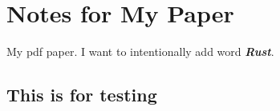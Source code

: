 \documentclass[12pt]{article}
\begin{document}
\section*{Notes for My Paper}
My pdf paper. I want to intentionally add word \textbf{\textit{Rust}}.

\subsection*{This is for testing}
\end{document}
